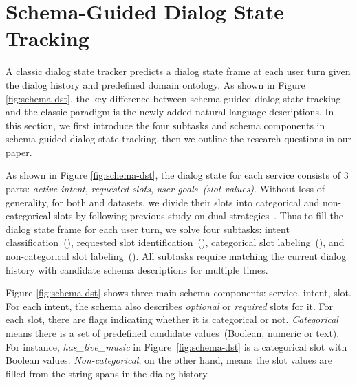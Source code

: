 \section{Schema-Guided Dialog State Tracking}
\label{sec:chanllenges-in-sgd}
A classic dialog state tracker predicts a dialog state frame at each
user turn given the dialog history and predefined domain ontology. As
shown in Figure \ref{fig:schema-dst}, the key difference between
schema-guided dialog state tracking and the classic paradigm is the
newly added natural language descriptions.  In this section, we first
introduce the four subtasks and schema components in schema-guided
dialog state tracking, then we outline the research questions in our
paper.

 As shown in Figure \ref{fig:schema-dst}, the
dialog state for each service consists of 3 parts: {\it active
  intent}, {\it requested slots}, {\it user goals~(slot
  values)}. Without loss of generality, for both \sgdst and \multiwoz
datasets, we divide their slots into categorical and non-categorical
slots by following previous study on
dual-strategies~\cite{zhang2019find}. Thus to fill the dialog state
frame for each user turn, we solve four subtasks: intent
classification~(\IC), requested slot identification~(\RSI), categorical
slot labeling~(\CSL), and non-categorical slot labeling~(\NSL). All
subtasks require matching the current dialog history with candidate
schema descriptions for multiple times.

 Figure \ref{fig:schema-dst} shows three
main schema components: service, intent, slot. For each intent, the
schema also describes {\it optional} or {\it required} slots for
it. For each slot, there are flags indicating whether it is
categorical or not. {\it Categorical} means there is a set of
predefined candidate values~(Boolean, numeric or text). For instance,
{\it has\_live\_music} in Figure~\ref{fig:schema-dst} is a categorical
slot with Boolean values. {\it Non-categorical}, on the other hand,
means the slot values are filled from the string spans in the dialog
history.

